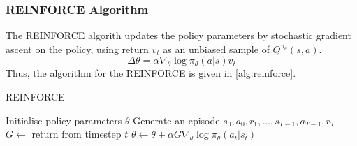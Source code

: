 \subsubsection{REINFORCE Algorithm}
The REINFORCE algorith updates the policy parameters by stochastic gradient ascent on the policy,
using return \(v_t\) as an unbiased sample of \(Q^{\pi_\theta}(s,a)\).
\[
    \Delta \theta = \alpha \nabla_\theta \log \pi_\theta(a|s) v_t
\] 
Thus, the algorithm for the REINFORCE is given in \autoref{alg:reinforce}.
\begin{algorithm}[H]
    \caption{REINFORCE}
    \label{alg:reinforce}
    \begin{algorithmic}[1]
        \State Initialise policy parameters \(\theta\)
            \State Generate an episode \(s_0,a_0,r_1,\dots,s_{T-1},a_{T-1},r_T\)
                \State \(G \leftarrow\) return from timestep \(t\)
                \State \(\theta \leftarrow \theta + \alpha G \nabla_\theta \log \pi_\theta(a_t|s_t)\)
            \EndFor
        \EndFor
    \end{algorithmic}
\end{algorithm}

